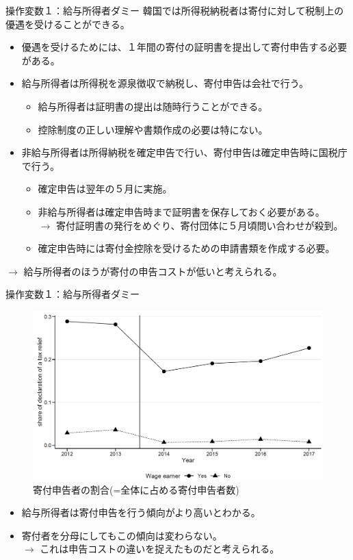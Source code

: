 \documentclass[dvipdfmx,10pt]{beamer}
\begin{document}
	\begin{frame}{操作変数１：給与所得者ダミー}
		韓国では所得税納税者は寄付に対して税制上の優遇を受けることができる。
		\begin{itemize}
			\item 優遇を受けるためには、１年間の寄付の証明書を提出して寄付申告する必要がある。
			\item 給与所得者は所得税を源泉徴収で納税し、寄付申告は会社で行う。
			\begin{itemize}
				\item 給与所得者は証明書の提出は随時行うことができる。
				\item 控除制度の正しい理解や書類作成の必要は特にない。
			\end{itemize}
			\item 非給与所得者は所得納税を確定申告で行い、寄付申告は確定申告時に国税庁で行う。			
			\begin{itemize}
				\item 確定申告は翌年の５月に実施。
				\item 非給与所得者は確定申告時まで証明書を保存しておく必要がある。\\
				$\to$ 寄付証明書の発行をめぐり、寄付団体に５月頃問い合わせが殺到。
				\item 確定申告時には寄付金控除を受けるための申請書類を作成する必要。
			\end{itemize}
		\end{itemize}
	$\to$ 給与所得者のほうが寄付の申告コストが低いと考えられる。
	\end{frame}
\begin{frame}{操作変数１：給与所得者ダミー}
	\begin{figure}
		\centering
		\includegraphics[width=0.7\linewidth]{Fig_Declaration}
		\caption{寄付申告者の割合(=全体に占める寄付申告者数)}
		\label{fig:4}
	\end{figure}
	\small
	\begin{itemize}
		\item 給与所得者は寄付申告を行う傾向がより高いとわかる。
		\item 寄付者を分母にしてもこの傾向は変わらない。\\
		$\to$ これは申告コストの違いを捉えたものだと考えられる。
	\end{itemize}
\end{frame}
\end{document}
